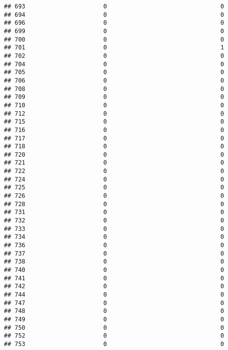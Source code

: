 \documentclass[
]{article}
\begin{document}
\begin{verbatim}
## 693                      0                                0
## 694                      0                                0
## 696                      0                                0
## 699                      0                                0
## 700                      0                                0
## 701                      0                                1
## 702                      0                                0
## 704                      0                                0
## 705                      0                                0
## 706                      0                                0
## 708                      0                                0
## 709                      0                                0
## 710                      0                                0
## 712                      0                                0
## 715                      0                                0
## 716                      0                                0
## 717                      0                                0
## 718                      0                                0
## 720                      0                                0
## 721                      0                                0
## 722                      0                                0
## 724                      0                                0
## 725                      0                                0
## 726                      0                                0
## 728                      0                                0
## 731                      0                                0
## 732                      0                                0
## 733                      0                                0
## 734                      0                                0
## 736                      0                                0
## 737                      0                                0
## 738                      0                                0
## 740                      0                                0
## 741                      0                                0
## 742                      0                                0
## 744                      0                                0
## 747                      0                                0
## 748                      0                                0
## 749                      0                                0
## 750                      0                                0
## 752                      0                                0
## 753                      0                                0

\end{verbatim}
\end{document}
